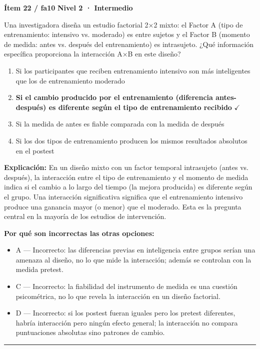 \documentclass[12pt,a4paper]{article}
\begin{document}
\begin{mdframed}[backgroundcolor=fondogris,linecolor=ambar,linewidth=1pt,innerleftmargin=10pt,innerrightmargin=10pt,innertopmargin=7pt,innerbottommargin=7pt]
\textbf{Ítem 22 / fa10} \hfill {\small\bfseries\color{ambar} Nivel 2 · Intermedio}
\end{mdframed}

Una investigadora diseña un estudio factorial 2×2 mixto: el Factor A (tipo de entrenamiento: intensivo vs. moderado) es entre sujetos y el Factor B (momento de medida: antes vs. después del entrenamiento) es intrasujeto. ¿Qué información específica proporciona la interacción A×B en este diseño?

\begin{enumerate}
  \item[A.] Si los participantes que reciben entrenamiento intensivo son más inteligentes que los de entrenamiento moderado
  \item[\textbf{\color{verde}B.}] \textbf{\color{verde} Si el cambio producido por el entrenamiento (diferencia antes-después) es diferente según el tipo de entrenamiento recibido} \hfill $\checkmark$
  \item[C.] Si la medida de antes es fiable comparada con la medida de después
  \item[D.] Si los dos tipos de entrenamiento producen los mismos resultados absolutos en el postest
\end{enumerate}

\noindent\textbf{\color{azul}Explicación:} En un diseño mixto con un factor temporal intrasujeto (antes vs. después), la interacción entre el tipo de entrenamiento y el momento de medida indica si el cambio a lo largo del tiempo (la mejora producida) es diferente según el grupo. Una interacción significativa significa que el entrenamiento intensivo produce una ganancia mayor (o menor) que el moderado. Esta es la pregunta central en la mayoría de los estudios de intervención.

\noindent\textbf{\color{gris}Por qué son incorrectas las otras opciones:}
\begin{itemize}
  \item {\small A — Incorrecto: las diferencias previas en inteligencia entre grupos serían una amenaza al diseño, no lo que mide la interacción; además se controlan con la medida pretest.}
  \item {\small C — Incorrecto: la fiabilidad del instrumento de medida es una cuestión psicométrica, no lo que revela la interacción en un diseño factorial.}
  \item {\small D — Incorrecto: si los postest fueran iguales pero los pretest diferentes, habría interacción pero ningún efecto general; la interacción no compara puntuaciones absolutas sino patrones de cambio.}
\end{itemize}
\vspace{8pt}\hrule\vspace{10pt}
\end{document}
